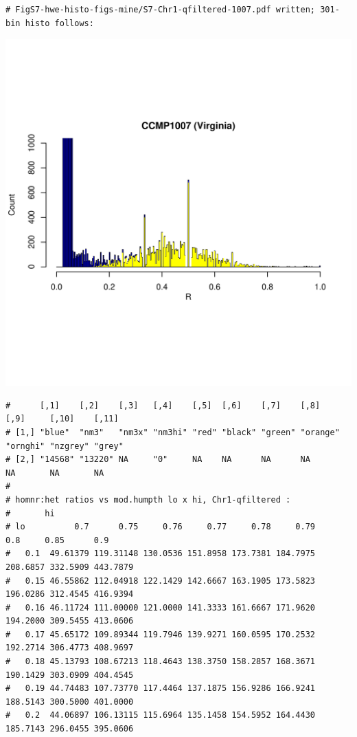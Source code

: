 \documentclass{article}\usepackage[]{graphicx}\usepackage[]{color}
\makeatletter
\def\maxwidth{ %
  \ifdim\Gin@nat@width>\linewidth
    \linewidth
  \else
    \Gin@nat@width
  \fi
}
\newenvironment{kframe}{%
 \def\at@end@of@kframe{}%
 \ifinner\ifhmode%
  \def\at@end@of@kframe{\end{minipage}}%
  \begin{minipage}{\columnwidth}%
 \fi\fi%
 \def\FrameCommand##1{\hskip\@totalleftmargin \hskip-\fboxsep
 \colorbox{shadecolor}{##1}\hskip-\fboxsep
     \hskip-\linewidth \hskip-\@totalleftmargin \hskip\columnwidth}%
 \MakeFramed {\advance\hsize-\width
   \@totalleftmargin\z@ \linewidth\hsize
   \@setminipage}}%
 {\par\unskip\endMakeFramed%
 \at@end@of@kframe}
\newenvironment{knitrout}{}{} %
\makeatother
\begin{document}
\begin{knitrout}
\begin{kframe}
\begin{verbatim}
# FigS7-hwe-histo-figs-mine/S7-Chr1-qfiltered-1007.pdf written; 301-bin histo follows:
\end{verbatim}
\end{kframe}
\includegraphics[width=\maxwidth]{FigS7-hwe-histo-figs-knitr/unnamed-chunk-10-43} 
\begin{kframe}\begin{verbatim}
#      [,1]    [,2]    [,3]   [,4]    [,5]  [,6]    [,7]    [,8]     [,9]     [,10]    [,11] 
# [1,] "blue"  "nm3"   "nm3x" "nm3hi" "red" "black" "green" "orange" "ornghi" "nzgrey" "grey"
# [2,] "14568" "13220" NA     "0"     NA    NA      NA      NA       NA       NA       NA
# 
# homnr:het ratios vs mod.humpth lo x hi, Chr1-qfiltered :
#       hi
# lo          0.7      0.75     0.76     0.77     0.78     0.79      0.8     0.85      0.9
#   0.1  49.61379 119.31148 130.0536 151.8958 173.7381 184.7975 208.6857 332.5909 443.7879
#   0.15 46.55862 112.04918 122.1429 142.6667 163.1905 173.5823 196.0286 312.4545 416.9394
#   0.16 46.11724 111.00000 121.0000 141.3333 161.6667 171.9620 194.2000 309.5455 413.0606
#   0.17 45.65172 109.89344 119.7946 139.9271 160.0595 170.2532 192.2714 306.4773 408.9697
#   0.18 45.13793 108.67213 118.4643 138.3750 158.2857 168.3671 190.1429 303.0909 404.4545
#   0.19 44.74483 107.73770 117.4464 137.1875 156.9286 166.9241 188.5143 300.5000 401.0000
#   0.2  44.06897 106.13115 115.6964 135.1458 154.5952 164.4430 185.7143 296.0455 395.0606

\end{verbatim}
\end{kframe}
\end{knitrout}
\end{document}

